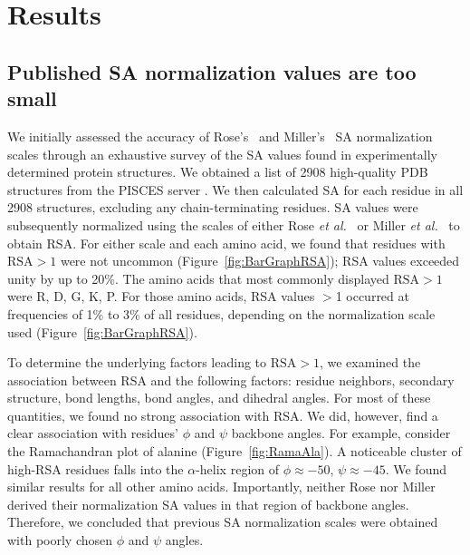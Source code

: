 \documentclass[11pt]{article}
\begin{document}
\section*{Results}

\subsection*{Published SA normalization values are too small}
We initially assessed the accuracy of Rose's~\cite{Rose1985} and Miller's~\cite{Miller1987} SA normalization scales through an exhaustive survey of the SA values found in experimentally determined protein structures. We obtained a list of 2908 high-quality PDB structures from the PISCES server \cite{WangDunbrack2003}. We then calculated SA for each residue in all 2908 structures, excluding any chain-terminating residues. SA values were subsequently normalized using the scales of either Rose \emph{et al.}~\cite{Rose1985} or Miller \emph{et al.}~\cite{Miller1987} to obtain RSA. For either scale and each amino acid, we found that residues with $\text{RSA}>1$ were not uncommon (Figure~\ref{fig:BarGraphRSA}); RSA values exceeded unity by up to 20\%. The amino acids that most commonly displayed $\text{RSA}>1$ were R, D, G, K, P. For those amino acids, RSA values $>$1 occurred at frequencies of 1\% to 3\% of all residues, depending on the normalization scale used (Figure~\ref{fig:BarGraphRSA}).

To determine the underlying factors leading to $\text{RSA}>1$, we examined the association between RSA and the following factors: residue neighbors, secondary structure, bond lengths, bond angles, and dihedral angles. For most of these quantities, we found no strong association with RSA. We did, however, find a clear association with residues' $\phi$ and $\psi$ backbone angles. For example, consider the Ramachandran plot of alanine (Figure~\ref{fig:RamaAla}). A noticeable cluster of high-RSA residues falls into the $\alpha$-helix region of $\phi\approx-50$, $\psi\approx-45$. We found similar results for all other amino acids. Importantly, neither Rose nor Miller derived their normalization SA values in that region of backbone angles. Therefore, we concluded that previous SA normalization scales were obtained with poorly chosen $\phi$ and $\psi$ angles.
\end{document}
